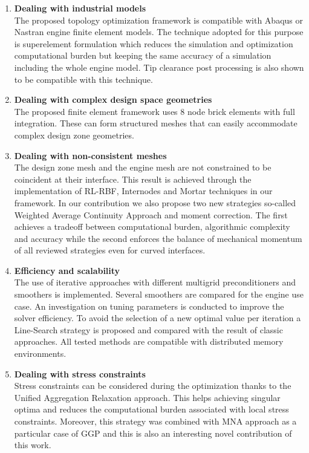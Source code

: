\begin{enumerate}
	\item \textbf{Dealing with industrial models}\\
	The proposed topology optimization framework is compatible with Abaqus or Nastran engine finite element models. The technique adopted for this purpose is superelement formulation  which reduces the simulation and optimization computational burden but keeping the same accuracy of a simulation including the whole engine model. Tip clearance post processing is also shown to be compatible with this technique.
	\item \textbf{Dealing with complex design space geometries}\\
	The proposed finite element framework uses 8 node brick elements with full integration. These can form structured meshes that can easily accommodate complex design zone geometries. 
	\item \textbf{Dealing with non-consistent meshes}\\
	The design zone mesh and the engine mesh are not constrained to be coincident at their interface. This result is achieved through the implementation of RL-RBF, Internodes and Mortar techniques in our framework. In our contribution \cite{coniglio2018weighted} we also propose two new strategies so-called Weighted Average Continuity Approach and moment correction. The first achieves a tradeoff between computational burden, algorithmic complexity and accuracy while the second enforces the balance of mechanical momentum of all reviewed strategies even for curved interfaces.
	\item \textbf{Efficiency and scalability}\\
	The use of iterative approaches with different multigrid preconditioners and smoothers is implemented. Several smoothers are compared for the engine use case. An investigation on tuning parameters is conducted to improve the solver efficiency. To avoid the selection of a new optimal value per iteration a Line-Search strategy is proposed and compared with the result of classic approaches.  All tested methods are compatible with distributed memory environments.
	\item \textbf{Dealing with stress constraints}\\
	Stress constraints can be considered during the optimization thanks to the Unified Aggregation Relaxation approach. This helps achieving singular optima and reduces the computational burden associated with local stress constraints. Moreover, this strategy was combined with MNA approach as a particular case of GGP and this is also an interesting novel contribution of this work.
	

\end{enumerate}
